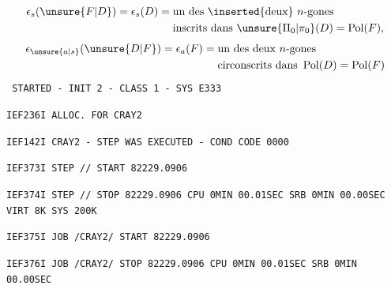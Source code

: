 \[
\begin{aligned}
\epsilon_s(\unsure{F|D})=\epsilon_s(D)={}&\text{un des }\inserted{\text{deux}}\ n\text{-gones}\\
&\text{inscrits dans }\unsure{\Pi_0|\pi_0}(D)=\operatorname{Pol}(F),
\end{aligned}
\]
\[
\begin{aligned}
\epsilon_{\unsure{a|s}}(\unsure{D|F})=\epsilon_a(F)={}&\text{un des deux }n\text{-gones}\\
&\text{circonscrits dans }\operatorname{Pol}(D)=\operatorname{Pol}(F)
\end{aligned}
\]
\texttt{ STARTED - INIT 2 - CLASS 1 - SYS E333}\par
\texttt{IEF236I ALLOC. FOR CRAY2}\par
\texttt{IEF142I CRAY2 - STEP WAS EXECUTED - COND CODE 0000}\par
\texttt{IEF373I STEP /\qquad / START 82229.0906}\par
\texttt{IEF374I STEP /\qquad / STOP 82229.0906 CPU 0MIN 00.01SEC SRB 0MIN 00.00SEC VIRT 8K SYS 200K}\par
\texttt{IEF375I JOB /CRAY2\qquad / START 82229.0906}\par
\texttt{IEF376I JOB /CRAY2\qquad / STOP 82229.0906 CPU 0MIN 00.01SEC SRB 0MIN 00.00SEC}
